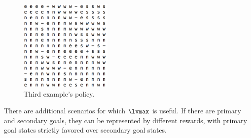 \begin{figure}[h]
    \centering
    \includegraphics[width=0.4\textwidth,bb=0 0 418 416]{seed_3.png}
    \caption{Third example's policy.}
    \label{fig:seed_3}
\end{figure}

There are additional scenarios for which $\lvmax$ is useful. If there are primary and secondary goals, they can be represented by different rewards, with primary goal states strictly favored over secondary goal states. 
